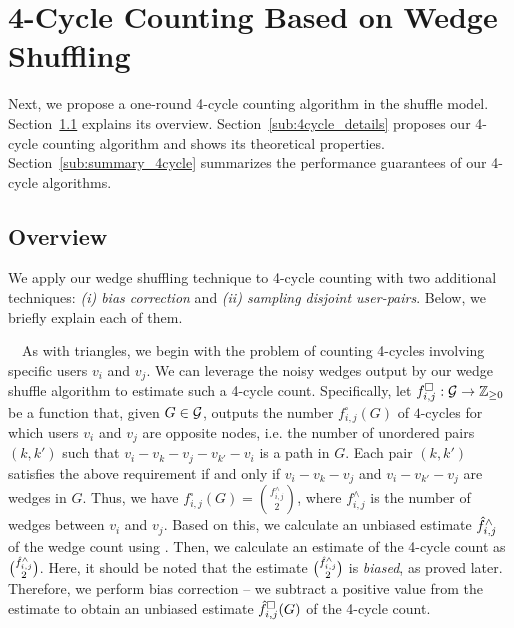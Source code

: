 \section{4-Cycle Counting Based on Wedge Shuffling}
\label{sec:4cycle}

Next, we propose a one-round 4-cycle counting algorithm in the shuffle model.
Section~\ref{sub:4cycle_overview} explains its overview.
Section~\ref{sub:4cycle_details} proposes our 4-cycle counting algorithm and shows its theoretical properties. 
Section~\ref{sub:summary_4cycle} summarizes the performance guarantees of our 4-cycle algorithms. 

\subsection{Overview}
\label{sub:4cycle_overview}
We apply our wedge shuffling technique to 4-cycle counting with two additional techniques: \textit{(i) bias correction} and \textit{(ii) sampling disjoint user-pairs}. 
Below, we briefly explain each of them. 

\smallskip
{}~~As with triangles, we begin with the problem of counting 4-cycles involving specific users $v_i$ and $v_j$. 
We can leverage the noisy wedges output by our wedge shuffle algorithm \AlgWS{} to estimate such a 4-cycle count. 
Specifically, let $f^\square_{i,j}: \mathcal{G} \rightarrow \mathbb{Z}_{\ge0}$ be a function that, given $G \in \mathcal{G}$, outputs the number $f^\square_{i,j}(G)$ of $4$-cycles for which users $v_i$ and $v_j$ are opposite nodes, i.e. the number of unordered pairs $(k,k')$ such that $v_i-v_k-v_j-v_{k'}-v_i$ is a path in $G$.
Each pair $(k,k')$ satisfies the above requirement if and only if $v_i-v_k-v_j$ and $v_i-v_{k'}-v_j$ are wedges in $G$.
Thus, we have $f^\square_{i,j}(G) = \binom{f^\wedge_{i,j}}{2}$, where $f^\wedge_{i,j}$ is the number of wedges between $v_i$ and $v_j$. 
Based on this, we calculate an unbiased estimate $\hat{f}^\wedge_{i,j}$ of the wedge count using \AlgWS{}. 
Then, we calculate an estimate of the 4-cycle count as $\binom{\hat{f}^\wedge_{i,j}}{2}$. 
Here, it should be noted that the estimate $\binom{\hat{f}^\wedge_{i,j}}{2}$ 
is \textit{biased}, as proved later. 
Therefore, 
we perform bias correction -- we subtract a positive value from the estimate to obtain an unbiased estimate $\hat{f}_{i,j}^\square(G)$ of the 4-cycle count. 

